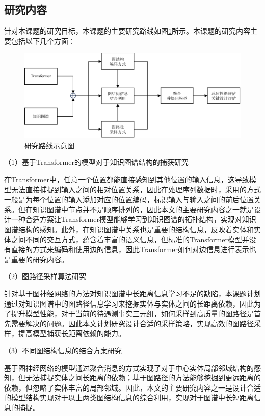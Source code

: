 \subsection{研究内容}


针对本课题的研究目标，本课题的主要研究路线如图\ref{research_route}所示。本课题的研究内容主要包括以下几个方面：

\begin{figure}[htb]
  \centerline{\includegraphics[width=1\textwidth]{pic/research_route.pdf}}
  \caption{研究路线示意图}
  \label{research_route}
\end{figure}

（1）基于Transformer的模型对于知识图谱结构的捕获研究

在Transformer中，任意一个位置都能直接感知到其他位置的输入信息，这导致模型无法直接捕捉到输入之间的相对位置关系，因此在处理序列数据时，采用的方式一般是为每个位置的输入添加对应的位置编码，标识输入与输入之间的前后位置关系。但在知识图谱中节点并不是顺序排列的，因此本文的主要研究内容之一就是设计一种合适方案让Transformer模型能够学习到知识图谱的拓扑结构，实现对知识图谱结构的感知。此外，在知识图谱中关系也是重要的结构信息，反映着实体和实体之间不同的交互方式，蕴含着丰富的语义信息，但标准的Transformer模型并没有直接的方式来编码和使用边的信息，因此Transformer如何对边信息进行表示也是重要的研究内容。

（2）图路径采样算法研究

针对基于图神经网络的方法对知识图谱中长距离信息学习不足的缺陷，本课题计划通过对知识图谱中的图路径信息学习来挖掘实体与实体之间的长距离依赖，因此为了提升模型性能，对于当前的待遇测事实三元组，如何采样到高质量的图路径是首先需要解决的问题。因此本文计划研究设计合适的采样策略，实现高效的图路径采样，提高模型捕获长距离依赖的能力。

（3）不同图结构信息的结合方案研究

基于图神经网络的模型通过聚合消息的方式实现了对于中心实体局部邻域结构的感知，但无法捕捉实体之间长距离的依赖；基于图路径的方法能够挖掘到更远距离的依赖，但忽略了实体丰富的局部邻域。因此，本文的主要研究内容之一是设计合适的模型结构实现对于以上两类图结构信息的综合利用，实现对于图谱中长短距离信息的捕捉。

